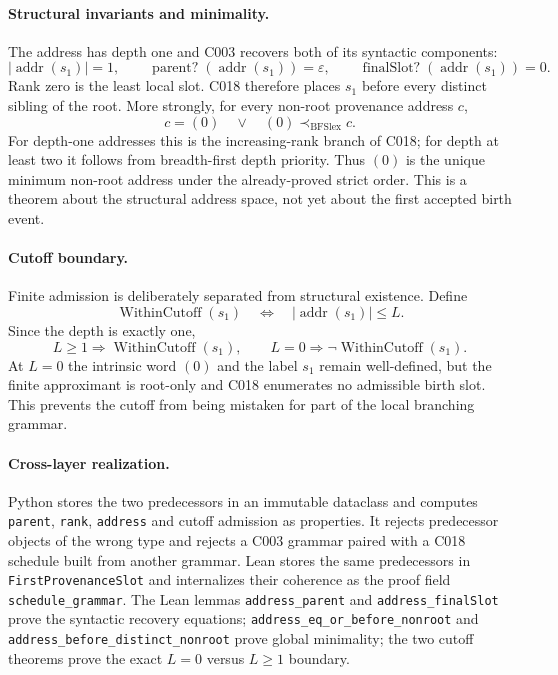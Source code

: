 \paragraph*{Structural invariants and minimality.}
The address has depth one and C003 recovers both of its syntactic components:
\begin{equation}
  |\operatorname{addr}(s_1)|=1,
  \qquad
  \operatorname{parent?}(\operatorname{addr}(s_1))=\varepsilon,
  \qquad
  \operatorname{finalSlot?}(\operatorname{addr}(s_1))=0.
  \label{eq:c004a-recovery}
\end{equation}
Rank zero is the least local slot.  C018 therefore places $s_1$ before every
distinct sibling of the root.  More strongly, for every non-root provenance
address $c$,
\begin{equation}
  c=(0)
  \quad\lor\quad
  (0)\prec_{\mathrm{BFSlex}}c.
  \label{eq:c004a-global-minimum}
\end{equation}
For depth-one addresses this is the increasing-rank branch of C018; for depth
at least two it follows from breadth-first depth priority.  Thus $(0)$ is the
unique minimum non-root address under the already-proved strict order.  This
is a theorem about the structural address space, not yet about the first
accepted birth event.

\paragraph*{Cutoff boundary.}
Finite admission is deliberately separated from structural existence.  Define
\begin{equation}
  \operatorname{WithinCutoff}(s_1)
  \quad\Longleftrightarrow\quad
  |\operatorname{addr}(s_1)|\le L.
\end{equation}
Since the depth is exactly one,
\begin{equation}
  L\ge1\Longrightarrow\operatorname{WithinCutoff}(s_1),
  \qquad
  L=0\Longrightarrow\neg\operatorname{WithinCutoff}(s_1).
  \label{eq:c004a-cutoff}
\end{equation}
At $L=0$ the intrinsic word $(0)$ and the label $s_1$ remain well-defined,
but the finite approximant is root-only and C018 enumerates no admissible
birth slot.  This prevents the cutoff from being mistaken for part of the
local branching grammar.

\paragraph*{Cross-layer realization.}
Python stores the two predecessors in an immutable dataclass and computes
\texttt{parent}, \texttt{rank}, \texttt{address} and cutoff admission as
properties.  It rejects predecessor objects of the wrong type and rejects a
C003 grammar paired with a C018 schedule built from another grammar.  Lean
stores the same predecessors in \texttt{FirstProvenanceSlot} and internalizes
their coherence as the proof field \texttt{schedule\_grammar}.  The Lean
lemmas \texttt{address\_parent} and \texttt{address\_finalSlot} prove the
syntactic recovery equations; \texttt{address\_eq\_or\_before\_nonroot} and
\texttt{address\_before\_distinct\_nonroot} prove global minimality; the two
cutoff theorems prove the exact $L=0$ versus $L\ge1$ boundary.

